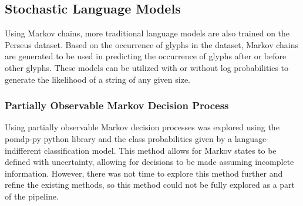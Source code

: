\subsection{Stochastic Language Models}

Using Markov chains, more traditional language models are also trained on the Perseus dataset. Based on the occurrence of glyphs in the dataset, Markov chains are generated to be used in predicting the occurrence of glyphs after or before other glyphs. These models can be utilized with or without log probabilities to generate the likelihood of a string of any given size.

\subsubsection{Partially Observable Markov Decision Process}

Using partially observable Markov decision processes \cite{Astrom} was explored using the pomdp-py python library \cite{Zheng} and the class probabilities given by a language-indifferent classification model. This method allows for Markov states to be defined with uncertainty, allowing for decisions to be made assuming incomplete information. However, there was not time to explore this method further and refine the existing methods, so this method could not be fully explored as a part of the pipeline.

